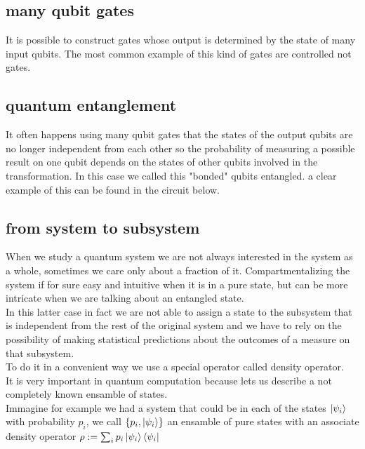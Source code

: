 \documentclass{article}
\begin{document}
\subsection{many qubit gates}
It is possible to construct gates whose output is determined by the state
of many input qubits.
The most common example of this kind of gates are controlled not gates.



\subsection{quantum entanglement}

It often happens using many qubit gates that the states of the output
qubits are no longer independent from each other so the probability
of measuring a possible result on one qubit depends on the states of
other qubits involved in the transformation.
In this case we called this "bonded" qubits entangled.
a clear example of this can be found in the circuit below.



\subsection{from system to subsystem}

When we study a quantum system we are not always interested in the
system
as a whole, sometimes we care only about a fraction of it.
Compartmentalizing the system if for sure easy and intuitive when it
is in a pure state, but can be more intricate when we are talking about
an entangled state.\\
In this latter case in fact we are not able to assign a state to the
subsystem that is independent from the rest of the original system
and we have to rely on the possibility of making statistical
predictions
about the outcomes of a measure on that subsystem.\\
To do it in a convenient way we use a special operator called density
operator.\\
It is very important in quantum computation because lets us describe
a not completely known ensamble of states.\\
Immagine for example we had a system that could be in each of the
states
$\ket{\psi_i}$ with probability $p_i$, we call $\{p_i,\ket{\psi_i}\}$ an
ensamble of pure states with an associate density operator
$\rho:=\sum_i p_i \ket{\psi_i}\bra{\psi_i} $
\end{document}
